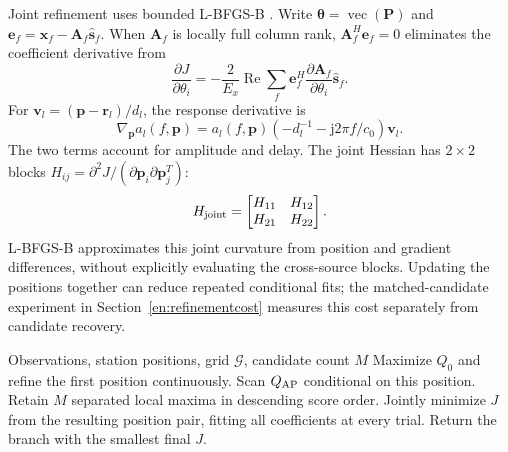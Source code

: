 \documentclass[a4paper,fleqn,review]{cas-sc}
\newcommand{\Rea}{\operatorname{Re}}
\begin{document}
Joint refinement uses bounded L-BFGS-B \cite{Byrd1995}. Write $\bm\theta=\operatorname{vec}(\bm P)$ and $\bm e_f=\bm x_f-\bm A_f\widehat{\bm s}_f$. When $\bm A_f$ is locally full column rank, $\bm A_f^H\bm e_f=0$ eliminates the coefficient derivative from
\begin{equation}
\frac{\partial J}{\partial\theta_i}=-\frac{2}{E_x}\Rea\sum_f
 \bm e_f^H\frac{\partial\bm A_f}{\partial\theta_i}\widehat{\bm s}_f.
\label{en:gradient}
\end{equation}
For $\bm v_l=(\bm p-\bm r_l)/d_l$, the response derivative is
\begin{equation}
\nabla_{\bm p}a_l(f,\bm p)=a_l(f,\bm p)
 (-d_l^{-1}-\mathrm j2\pi f/c_0)\bm v_l.
\end{equation}
The two terms account for amplitude and delay. The joint Hessian has $2\times2$ blocks $H_{ij}=\partial^2J/(\partial\bm p_i\partial\bm p_j^T)$:
\begin{equation}
H_{\rm joint}=\begin{bmatrix}H_{11}&H_{12}\\H_{21}&H_{22}\end{bmatrix}.
\end{equation}
L-BFGS-B approximates this joint curvature from position and gradient differences, without explicitly evaluating the cross-source blocks. Updating the positions together can reduce repeated conditional fits; the matched-candidate experiment in Section~\ref{en:refinementcost} measures this cost separately from candidate recovery.

\begin{algorithm}[H]
\caption{MCJ-AP}\label{en:algap}
\begin{algorithmic}[1]
\Require Observations, station positions, grid $\mathcal G$, candidate count $M$
\State Maximize $Q_0$ and refine the first position continuously.
\State Scan $Q_{\rm AP}$ conditional on this position.
\State Retain $M$ separated local maxima in descending score order.
\State Jointly minimize $J$ from the resulting position pair, fitting all coefficients at every trial.
\EndFor
\State Return the branch with the smallest final $J$.
\end{algorithmic}
\end{algorithm}

\FloatBarrier
\end{document}
